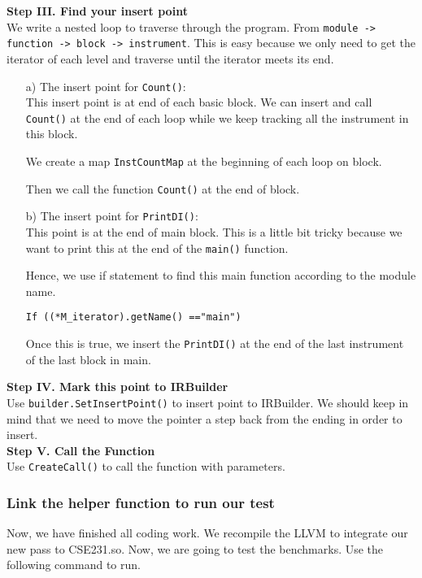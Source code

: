 \documentclass{acm_proc_article-sp}
\begin{document}
\textbf{Step III. Find your insert point}\\
We write a nested loop to traverse through the program. 
From {\tt module -> function -> block -> instrument}. This is easy because we only need to get the iterator of each level and traverse until the iterator meets its end.
\begin{itemize}
\vspace{-0.05in}
\item[a)] The insert point for {\tt Count()}:\\
This insert point is at end of each basic block. We can insert and call {\tt Count()} at the end of each loop while we keep tracking all the instrument in this block.

We create a map {\tt InstCountMap} at the beginning of each loop on block.

Then we call the function {\tt Count()} at the end of block.

\item[b)] The insert point for {\tt PrintDI()}:\\
This point is at the end of main block. This is a little bit tricky because we want to print this at the end of the {\tt main()} function.

Hence, we use if statement to find this main function according to the module name.

{\tt If ((*M\_iterator).getName() =="main")}

Once this is true, we insert the {\tt PrintDI()} at the end of the last instrument of the last block in main.
\vspace{-0.05in}
\end{itemize}
\textbf{Step IV. Mark this point to IRBuilder}\\
Use {\tt builder.SetInsertPoint()} to insert point to IRBuilder. We should keep in mind that we need to move the pointer a step back from the ending in order to insert.
 \vspace{0.05in}\\
\textbf{Step V. Call the Function}\\
Use {\tt CreateCall()} to call the function with parameters.

\subsubsection{Link the helper function to run our test}
Now, we have finished all coding work. We recompile the LLVM to integrate our new pass to CSE231.so. Now, we are going to test the benchmarks. Use the following command to run.
\vspace{-0.02in}

%
\end{document}
